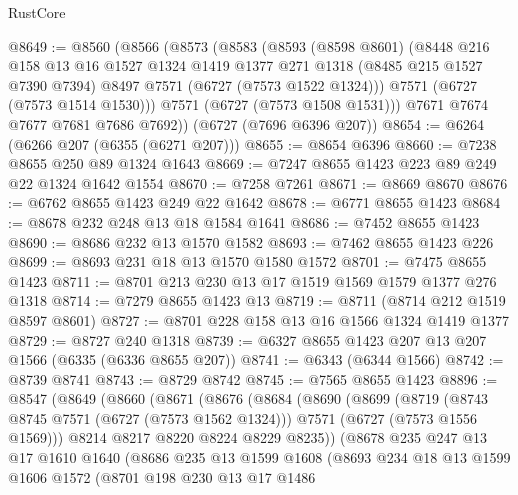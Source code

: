 \begin{lexlean}{RustCore}
\begin{coremodule}
@8649 := @8560
    (@8566
      (@8573
        (@8583
          (@8593
            (@8598 @8601)
            (@8448
              @216
              @158
              @13
              @16
              @1527
              @1324
              @1419
              @1377
              @271
              @1318
              (@8485 @215 @1527 @7390 @7394)
              @8497
              @7571
              (@6727 (@7573 @1522 @1324)))
            @7571
            (@6727 (@7573 @1514 @1530)))
          @7571
          (@6727 (@7573 @1508 @1531)))
        @7671
        @7674
        @7677
        @7681
        @7686
        @7692))
    (@6727 (@7696 @6396 @207))
@8654 := @6264 (@6266 @207 (@6355 (@6271 @207)))
@8655 := @8654 @6396
@8660 := @7238 @8655 @250 @89 @1324 @1643
@8669 := @7247 @8655 @1423 @223 @89 @249 @22 @1324 @1642 @1554
@8670 := @7258 @7261
@8671 := @8669 @8670
@8676 := @6762 @8655 @1423 @249 @22 @1642
@8678 := @6771 @8655 @1423
@8684 := @8678 @232 @248 @13 @18 @1584 @1641
@8686 := @7452 @8655 @1423
@8690 := @8686 @232 @13 @1570 @1582
@8693 := @7462 @8655 @1423 @226
@8699 := @8693 @231 @18 @13 @1570 @1580 @1572
@8701 := @7475 @8655 @1423
@8711 := @8701 @213 @230 @13 @17 @1519 @1569 @1579 @1377 @276 @1318
@8714 := @7279 @8655 @1423 @13
@8719 := @8711 (@8714 @212 @1519 @8597 @8601)
@8727 := @8701 @228 @158 @13 @16 @1566 @1324 @1419 @1377
@8729 := @8727 @240 @1318
@8739 := @6327 @8655 @1423 @207 @13 @207 @1566 (@6335 (@6336 @8655 @207))
@8741 := @6343 (@6344 @1566)
@8742 := @8739 @8741
@8743 := @8729 @8742
@8745 := @7565 @8655 @1423
@8896 := @8547
    (@8649
      (@8660
        (@8671
          (@8676
            (@8684
              (@8690
                (@8699
                  (@8719
                    (@8743 @8745 @7571 (@6727 (@7573 @1562 @1324)))
                    @7571
                    (@6727 (@7573 @1556 @1569)))
                  @8214
                  @8217
                  @8220
                  @8224
                  @8229
                  @8235))
              (@8678
                @235
                @247
                @13
                @17
                @1610
                @1640
                (@8686
                  @235
                  @13
                  @1599
                  @1608
                  (@8693
                    @234
                    @18
                    @13
                    @1599
                    @1606
                    @1572
                    (@8701
                      @198
                      @230
                      @13
                      @17
                      @1486

\end{coremodule}
\end{lexlean}
